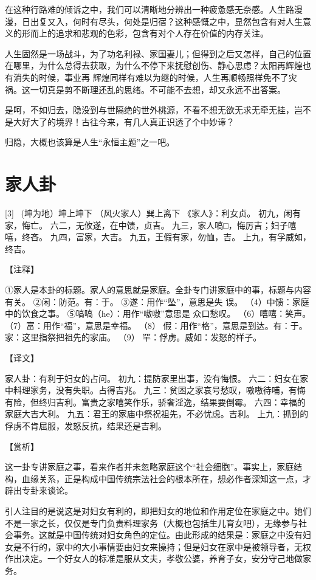 \documentclass[12pt,UTF8]{ctexbook}
\begin{document}
在这种行路难的倾诉之中，我们可以清晰地分辨出一种疲惫感无奈感。人生路漫漫，日出复又入，何时有尽头，何处是归宿？这种感慨之中，显然包含有对人生意义的形而上的追求和悲观的色彩，包含有对个人存在价值的内存关注。

人生固然是一场战斗，为了功名利禄、家国妻儿；但得到之后又怎样，自己的位置在哪里，为什么总得去获取，为什么不停下来抚慰创伤、静心思虑？太阳再辉煌也有消失的时候，事业再 辉煌同样有难以为继的时候，人生再顺畅照样免不了灾祸。这一切真是剪不断理还乱的思绪。不可能不去想，却又永远不出答案。

是呵，不如归去，隐没到与世隔绝的世外桃源，不看不想无欲无求无牵无挂，岂不是大好大了的境界！古往今来，有几人真正识透了个中妙谛？

归隐，大概也该算是人生“永恒主题”之一吧。

\chapter{家人卦}
[3] \ (坤为地）坤上坤下
（风火家人）巽上离下
《家人》：利女贞。
初九，闲有家，悔亡。
六二，无攸遂，在中馈，贞吉。
九三，家人嗃□，悔厉吉；妇子嘻嘻，终吝。
九四，富家，大吉。
九五，王假有家，勿恤，吉。
上九，有孚威如，终吉。

【注释】

①家人是本卦的标题。家人的意思就是家庭。全卦专门讲家庭中的事，标题与内容有关。
②闲：防范。有：于。
③遂：用作“坠”，意思是失 误。
（4）中馈：家庭中的饮食之事。
⑤嗃嗃（he）：用作“嗷嗷”意思是 众口愁叹。
（6）嘻嘻：笑声。
（7）富：用作“福”，意思是幸福。
（8） 假：用作“格”，意思是到达。有：于。家：这里指祭把祖先的家庙。
（9） 罕：俘虏。威如：发怒的样子。

【译文】

家人卦：有利于妇女的占问。
初九：提防家里出事，没有悔恨。
六二：妇女在家中料理家务，没有失职。占得吉兆。
九三：贫困之家哀号愁叹，嗷嗷待哺，有悔有险，但终归吉利。富贵之家嘻笑作乐，骄奢淫逸，结果要倒霉。
六四：幸福的家庭大吉大利。
九五：君王的家庙中祭祝祖先，不必忧虑。吉利。
上九：抓到的俘虏不肯屈服，发怒反抗，结果还是吉利。

【赏析】

这一卦专讲家庭之事，看来作者并未忽略家庭这个“社会细胞”。事实上，家庭结构，血缘关系，正是构成中国传统宗法社会的根本所在，想必作者深知这一点，才辟出专卦来谈论。

引人注目的是说这是对妇女有利的，即把妇女的地位和作用定位在家庭之中。她们不是一家之长，仅仅是专门负责料理家务（大概也包括生儿育女吧），无缘参与社会事务。这就是中国传统对妇女角色的定位。由此形成的结果是：家庭之中没有妇女是不行的，家中的大小事情要由妇女来操持；但是妇女在家中是被领导者，无权作出决定。一个好女人的标准是服从文夫，孝敬公婆，养育子女，安分守己地做家务。
\end{document}
